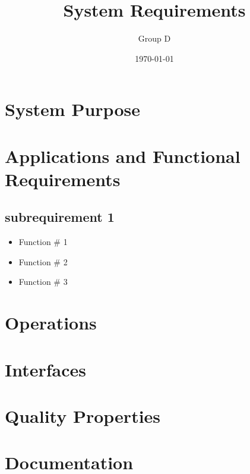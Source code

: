 \documentclass[a4paper]{article}
\title{System Requirements}
\author{Group D}
\date{\today}
\begin{document}
	\maketitle
	\thispagestyle{empty}
	\setcounter{page}{0}
	\pagebreak
	\tableofcontents
	\pagebreak
	

	\section{System Purpose} %
	\section{Applications and Functional Requirements}
	\subsection{subrequirement 1}
	\begin{itemize}
			\item Function \# 1
			\item Function \# 2
			\item Function \# 3
		\end{itemize}
	\section{Operations}
	\section{Interfaces}
	\section{Quality Properties}
	\section{Documentation}
	
\end{document}
